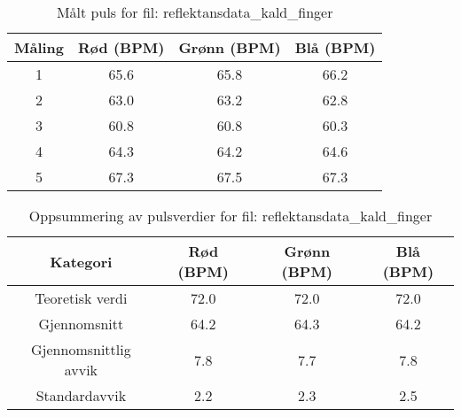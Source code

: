 
\begin{table}[H]
\centering
\caption{Målt puls for fil: reflektansdata\_kald\_finger}
\label{tab:reflektansdata\_kald\_finger}
\begin{tabular}{|c|c|c|c|}
\hline
\textbf{Måling} & \textbf{Rød (BPM)} & \textbf{Grønn (BPM)} & \textbf{Blå (BPM)} \\ \hline
1 & 65.6 & 65.8 & 66.2 \\ \hline
2 & 63.0 & 63.2 & 62.8 \\ \hline
3 & 60.8 & 60.8 & 60.3 \\ \hline
4 & 64.3 & 64.2 & 64.6 \\ \hline
5 & 67.3 & 67.5 & 67.3 \\ \hline
\end{tabular}
\end{table}

\begin{table}[H]
\centering
\caption{Oppsummering av pulsverdier for fil: reflektansdata\_kald\_finger}
\label{tab:reflektansdata\_kald\_finger_summary}
\begin{tabular}{|c|c|c|c|}
\hline
\textbf{Kategori} & \textbf{Rød (BPM)} & \textbf{Grønn (BPM)} & \textbf{Blå (BPM)} \\ \hline
Teoretisk verdi & 72.0 & 72.0 & 72.0 \\ \hline
Gjennomsnitt & 64.2 & 64.3 & 64.2 \\ \hline
Gjennomsnittlig avvik & 7.8 & 7.7 & 7.8 \\ \hline
Standardavvik & 2.2 & 2.3 & 2.5 \\ \hline
\end{tabular}
\end{table}